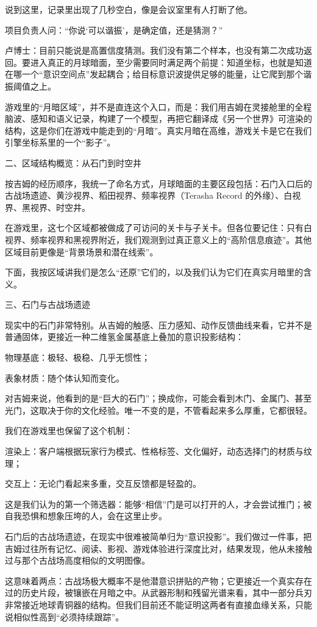 说到这里，记录里出现了几秒空白，像是会议室里有人打断了他。

项目负责人问：“你说‘可以谐振’，是确定值，还是猜测？”

卢博士：目前只能说是高置信度猜测。我们没有第二个样本，也没有第二次成功返回。要进入真正的月球暗面，至少需要同时满足两个前提：知道坐标，也就是知道在哪一个“意识空间点”发起耦合；给目标意识波提供足够的能量，让它爬到那个谐振阈值之上。

游戏里的“月暗区域”，并不是直连这个入口，而是：我们用吉姆在灵接舱里的全程脑波、感知和语义记录，构建了一个模型，再把它翻译成《另一个世界》可渲染的结构，这是你们在游戏中能走到的“月暗”。真实月暗在高维，游戏关卡是它在我们引擎坐标系里的一个“影子”。

二、区域结构概览：从石门到时空井

按吉姆的经历顺序，我统一了命名方式，月球暗面的主要区段包括：石门入口后的古战场遗迹、黄沙视界、稻田视界、频率视界（Terasha Record 的外缘）、白视界、黑视界、时空井。

在游戏里，这七个区域都被做成了可访问的关卡与子关卡。但各位要记住：只有白视界、频率视界和黑视界附近，我们观测到过真正意义上的“高阶信息痕迹”。其他区域目前更像是“背景场景和潜在线索”。

下面，我按区域讲我们是怎么“还原”它们的，以及我们认为它们在真实月暗里的含义。

三、石门与古战场遗迹

现实中的石门非常特别。从吉姆的触感、压力感知、动作反馈曲线来看，它并不是普通固体，更接近一种二维氢金属基底上叠加的意识投影结构：

物理基底：极轻、极稳、几乎无惯性；

表象材质：随个体认知而变化。

对吉姆来说，他看到的是“巨大的石门”；换成你，可能会看到木门、金属门、甚至光门，这取决于你的文化经验。唯一不变的是，不管看起来多么厚重，它都很轻。

我们在游戏里也保留了这个机制：

渲染上：客户端根据玩家行为模式、性格标签、文化偏好，动态选择门的材质与纹理；

交互上：无论门看起来多重，交互反馈都是轻盈的。

这是我们认为的第一个筛选器：能够“相信”门是可以打开的人，才会尝试推门；被自我恐惧和想象压垮的人，会在这里止步。

石门后的古战场遗迹，在现实中很难被简单归为“意识投影”。我们做过一件事，把吉姆过往所有记忆、阅读、影视、游戏体验进行深度比对，结果发现，他从未接触过与那个古战场高度相似的文明图像。

这意味着两点：古战场极大概率不是他潜意识拼贴的产物；它更接近一个真实存在过的历史片段，被镶嵌在月暗之中。从武器形制和残留光谱来看，其中一部分兵刃非常接近地球青铜器的结构。但我们目前还不能证明这两者有直接血缘关系，只能说相似性高到“必须持续跟踪”。


